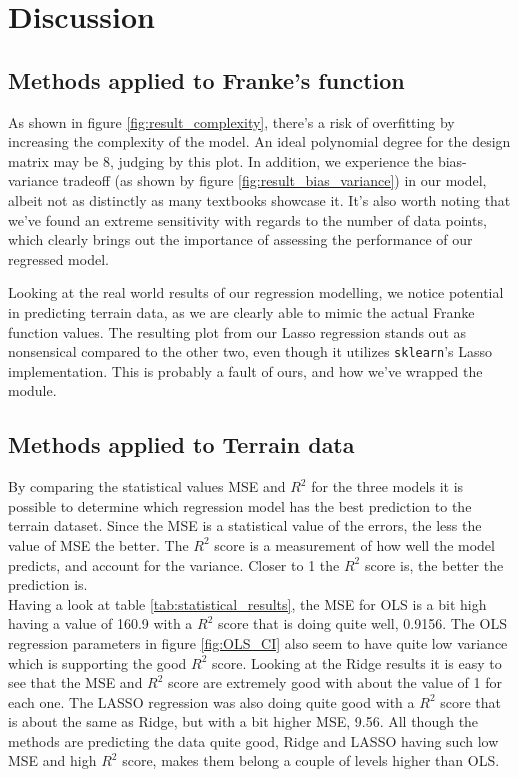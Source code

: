 \documentclass[../main.tex]{subfiles}
\begin{document}
\section{Discussion}\label{sec:discussion}
\subsection{Methods applied to Franke's function}

As shown in figure \ref{fig:result_complexity}, there's a risk of overfitting by increasing the complexity of the model. An ideal polynomial degree for the design matrix may be $8$, judging by this plot. In addition, we experience the bias-variance tradeoff (as shown by figure \ref{fig:result_bias_variance}) in our model, albeit not as distinctly as many textbooks showcase it. It's also worth noting that we've found an extreme sensitivity with regards to the number of data points, which clearly brings out the importance of assessing the performance of our regressed model. 

Looking at the real world results of our regression modelling, we notice potential in predicting terrain data, as we are clearly able to mimic the actual Franke function values. The resulting plot from our Lasso regression stands out as nonsensical compared to the other two, even though it utilizes \verb|sklearn|'s Lasso implementation. This is probably a fault of ours, and how we've wrapped the module.

\subsection{Methods applied to Terrain data}
By comparing the statistical values MSE and $R^2$ for the three models it is possible to determine which regression model has the best prediction to the terrain dataset. Since the MSE is a statistical value of the errors, the less the value of MSE the better. The $R^2$ score is a measurement of how well the model predicts, and account for the variance. Closer to 1 the $R^2$ score is, the better the prediction is.\\

Having a look at table \ref{tab:statistical_results}, the MSE for OLS is a bit high having a value of 160.9 with a $R^2$ score that is doing quite well, 0.9156. The OLS regression parameters in figure \ref{fig:OLS_CI} also seem to have quite low variance which is supporting the good $R^2$ score. Looking at the Ridge results it is easy to see that the MSE and $R^2$ score are extremely good with about the value of 1 for each one. The LASSO regression was also doing quite good with a $R^2$ score that is about the same as Ridge, but with a bit higher MSE, 9.56.  All though the methods are predicting the data quite good, Ridge and LASSO having such low MSE and high $R^2$ score, makes them belong a couple of levels higher than OLS.
\end{document}
